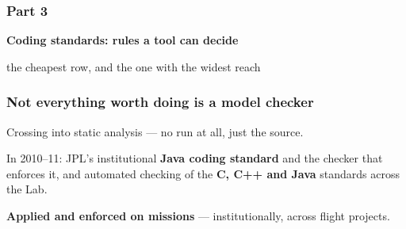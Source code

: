 \begin{frame}
  \frametitle{Part 3}

\iconcs[3.2]

\vspace{0.45cm}

{\Large\bf Coding standards: rules a tool can decide}

\vspace{0.4cm}

{\small the cheapest row, and the one with the widest reach}

\end{frame}

\begin{frame}
  \frametitle{Not everything worth doing is a model checker} \small

Crossing into static analysis --- no run at all, just the source.

\vspace{0.3cm}

In 2010--11: JPL's institutional {\bf Java coding standard} and the checker that
enforces it, and automated checking of the {\bf C, C++ and Java} standards across
the Lab.

\pause
\vspace{0.45cm}

\begin{block}{}\small
\centering
{\bf Applied and enforced on missions} --- institutionally, across flight projects.
\end{block}

\vspace{0.35cm}


\end{frame}
